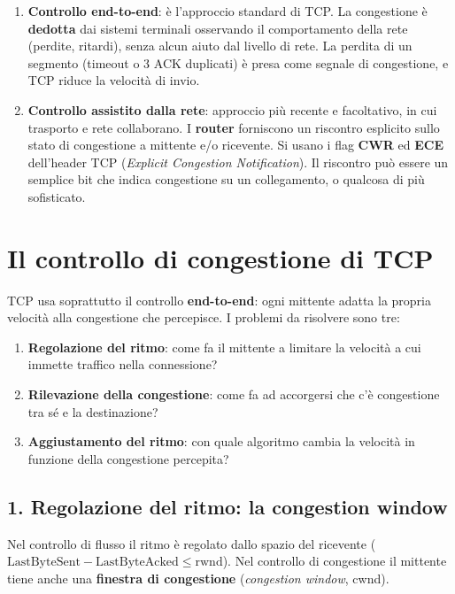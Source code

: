 \begin{enumerate}
    \item \textbf{Controllo end-to-end}: è l'approccio standard di TCP. La congestione è \textbf{dedotta} dai sistemi
          terminali osservando il comportamento della rete (perdite, ritardi), senza alcun aiuto dal livello di rete.
          La perdita di un segmento (timeout o 3 ACK duplicati) è presa come segnale di congestione, e TCP riduce la
          velocità di invio.
    \item \textbf{Controllo assistito dalla rete}: approccio più recente e facoltativo, in cui trasporto e rete
          collaborano. I \textbf{router} forniscono un riscontro esplicito sullo stato di congestione a mittente e/o
          ricevente. Si usano i flag \textbf{CWR} ed \textbf{ECE} dell'header TCP (\emph{Explicit Congestion
          Notification}). Il riscontro può essere un semplice bit che indica congestione su un collegamento, o qualcosa
          di più sofisticato.
\end{enumerate}

\section{Il controllo di congestione di TCP}

TCP usa soprattutto il controllo \textbf{end-to-end}: ogni mittente adatta la propria velocità alla
congestione che percepisce. I problemi da risolvere sono tre:

\begin{enumerate}
    \item \textbf{Regolazione del ritmo}: come fa il mittente a limitare la velocità a cui immette traffico nella connessione?
    \item \textbf{Rilevazione della congestione}: come fa ad accorgersi che c'è congestione tra sé e la destinazione?
    \item \textbf{Aggiustamento del ritmo}: con quale algoritmo cambia la velocità in funzione della congestione percepita?
\end{enumerate}

\subsection{1. Regolazione del ritmo: la congestion window}

Nel controllo di flusso il ritmo è regolato dallo spazio del ricevente
($\text{LastByteSent} - \text{LastByteAcked} \leq \text{rwnd}$). Nel controllo di congestione il mittente
tiene anche una \textbf{finestra di congestione} (\emph{congestion window}, cwnd).


